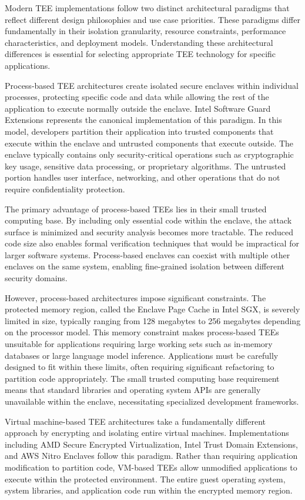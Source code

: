 Modern TEE implementations follow two distinct architectural paradigms that reflect different design philosophies and use case priorities. These paradigms differ fundamentally in their isolation granularity, resource constraints, performance characteristics, and deployment models. Understanding these architectural differences is essential for selecting appropriate TEE technology for specific applications.

Process-based TEE architectures create isolated secure enclaves within individual processes, protecting specific code and data while allowing the rest of the application to execute normally outside the enclave. Intel Software Guard Extensions represents the canonical implementation of this paradigm. In this model, developers partition their application into trusted components that execute within the enclave and untrusted components that execute outside. The enclave typically contains only security-critical operations such as cryptographic key usage, sensitive data processing, or proprietary algorithms. The untrusted portion handles user interface, networking, and other operations that do not require confidentiality protection.

The primary advantage of process-based TEEs lies in their small trusted computing base. By including only essential code within the enclave, the attack surface is minimized and security analysis becomes more tractable. The reduced code size also enables formal verification techniques that would be impractical for larger software systems. Process-based enclaves can coexist with multiple other enclaves on the same system, enabling fine-grained isolation between different security domains.

However, process-based architectures impose significant constraints. The protected memory region, called the Enclave Page Cache in Intel SGX, is severely limited in size, typically ranging from 128 megabytes to 256 megabytes depending on the processor model. This memory constraint makes process-based TEEs unsuitable for applications requiring large working sets such as in-memory databases or large language model inference. Applications must be carefully designed to fit within these limits, often requiring significant refactoring to partition code appropriately. The small trusted computing base requirement means that standard libraries and operating system APIs are generally unavailable within the enclave, necessitating specialized development frameworks.

Virtual machine-based TEE architectures take a fundamentally different approach by encrypting and isolating entire virtual machines. Implementations including AMD Secure Encrypted Virtualization, Intel Trust Domain Extensions, and AWS Nitro Enclaves follow this paradigm. Rather than requiring application modification to partition code, VM-based TEEs allow unmodified applications to execute within the protected environment. The entire guest operating system, system libraries, and application code run within the encrypted memory region.

